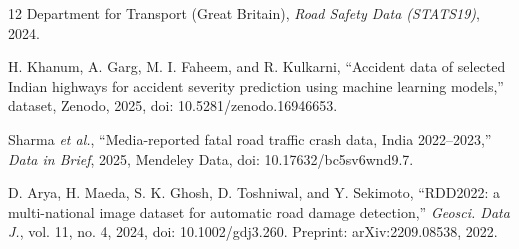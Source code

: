 \documentclass[journal]{IEEEtran}
\begin{document}
\begin{thebibliography}{12}
 Department for Transport (Great Britain), \emph{Road Safety Data (STATS19)}, 2024.

 H. Khanum, A. Garg, M. I. Faheem, and R. Kulkarni, ``Accident data of selected Indian highways for accident severity prediction using machine learning models,'' dataset, Zenodo, 2025, doi: 10.5281/zenodo.16946653.

 Sharma \emph{et al.}, ``Media-reported fatal road traffic crash data, India 2022--2023,'' \emph{Data in Brief}, 2025, Mendeley Data, doi: 10.17632/bc5sv6wnd9.7.

 D. Arya, H. Maeda, S. K. Ghosh, D. Toshniwal, and Y. Sekimoto, ``RDD2022: a multi-national image dataset for automatic road damage detection,'' \emph{Geosci. Data J.}, vol. 11, no. 4, 2024, doi: 10.1002/gdj3.260. Preprint: arXiv:2209.08538, 2022.

\end{thebibliography}
\end{document}
